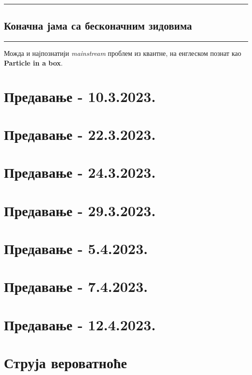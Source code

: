 \documentclass{tufte-handout} %
\theoremstyle{definition}
\theoremstyle{remark}
\begin{document}
\vspace{1em}
\hrule
\subsection*{Коначна јама са бесконачним зидовима}
\hrule
\vspace{1em}
Можда и најпознатији \textsf{\textit{mainstream}} проблем из квантне, на енглеском познат као \textbf{Particle in a box}.
\newpage
\section{Предавање - 10.3.2023.}
\section{Предавање - 22.3.2023.}
\section{Предавање - 24.3.2023.}
\section{Предавање - 29.3.2023.}
\section{Предавање - 5.4.2023.}
\section{Предавање - 7.4.2023.}
\section{Предавање - 12.4.2023.}





\appendix
\section{Струја вероватноће}
\end{document}
